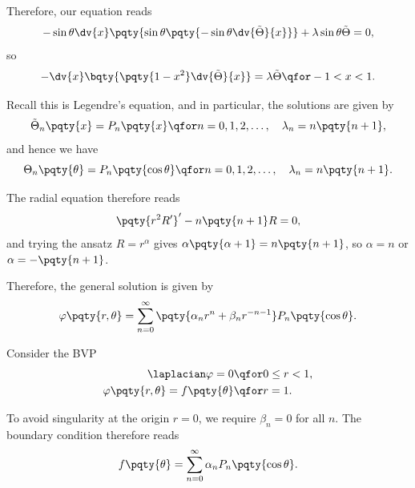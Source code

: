 {Therefore, our equation reads
\begin{equation}
    - \sin \theta \dv{x} \pqty{\sin \theta \pqty{- \sin \theta \dv{\tilde{\Theta}}{x}}} + \lambda \sin \theta \tilde{\Theta} = 0,
\end{equation}
so
\begin{equation}
    - \dv{x} \bqty{\pqty{1 - x^2} \dv{\tilde{\Theta}}{x}} = \lambda \tilde{\Theta} \qfor -1 < x < 1.
\end{equation}

Recall this is Legendre's equation, and in particular, the solutions are given by
\begin{equation}
    \tilde{\Theta}_n\pqty{x} = P_n\pqty{x} \qfor n = 0, 1, 2, \ldots, \quad \lambda_n = n \pqty{n + 1},
\end{equation}
and hence we have
\begin{equation}
    \Theta_n\pqty{\theta} = P_n\pqty{\cos \theta} \qfor n = 0, 1, 2, \ldots, \quad \lambda_n = n \pqty{n + 1}.
\end{equation}

The radial equation therefore reads
\begin{equation}
    \pqty{r^2 R'}' - n \pqty{n + 1} R = 0,
\end{equation}
and trying the ansatz \(R = r^\alpha\) gives \(\alpha\pqty{\alpha + 1} = n \pqty{n + 1}\), so \(\alpha = n\) or \(\alpha = - \pqty{n + 1}\).

Therefore, the general solution is given by
\begin{equation}
    \varphi\pqty{r, \theta} = \sum_{n = 0}^{\infty} \pqty{\alpha_n r^n + \beta_n r^{-n - 1}} P_n\pqty{\cos \theta}.
\end{equation}

\begin{example}
    Consider the BVP
    \begin{subequations}
        \begin{align}
            \laplacian \varphi = 0 &\qfor 0 \leq r < 1, \\
            \varphi\pqty{r, \theta} = f\pqty{\theta} &\qfor r = 1.
        \end{align}
    \end{subequations}

    To avoid singularity at the origin \(r = 0\), we require \(\beta_n = 0\) for all \(n\). The boundary condition therefore reads
    \begin{equation}
        f\pqty{\theta} = \sum_{n = 0}^{\infty} \alpha_n P_n\pqty{\cos \theta}.
    \end{equation}
    

\end{example}}
